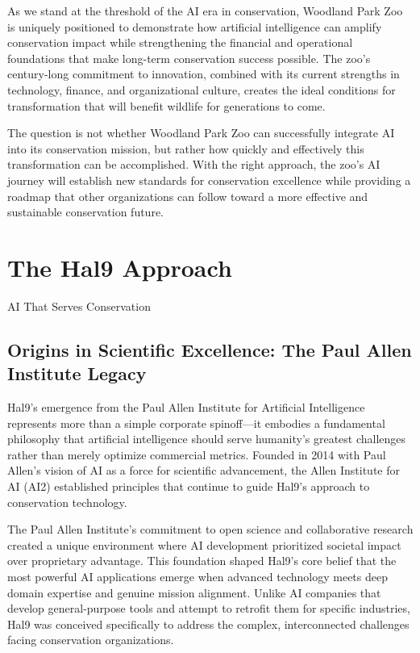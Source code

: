 \documentclass[
  Letterpaper,
]{scrbook}
\begin{document}
As we stand at the threshold of the AI era in conservation, Woodland
Park Zoo is uniquely positioned to demonstrate how artificial
intelligence can amplify conservation impact while strengthening the
financial and operational foundations that make long-term conservation
success possible. The zoo's century-long commitment to innovation,
combined with its current strengths in technology, finance, and
organizational culture, creates the ideal conditions for transformation
that will benefit wildlife for generations to come.

The question is not whether Woodland Park Zoo can successfully integrate
AI into its conservation mission, but rather how quickly and effectively
this transformation can be accomplished. With the right approach, the
zoo's AI journey will establish new standards for conservation
excellence while providing a roadmap that other organizations can follow
toward a more effective and sustainable conservation future.


\chapter{The Hal9 Approach}\label{the-hal9-approach}

AI That Serves Conservation

\hfill\break

\section{Origins in Scientific Excellence: The Paul Allen Institute
Legacy}\label{origins-in-scientific-excellence-the-paul-allen-institute-legacy}

Hal9's emergence from the Paul Allen Institute for Artificial
Intelligence represents more than a simple corporate spinoff---it
embodies a fundamental philosophy that artificial intelligence should
serve humanity's greatest challenges rather than merely optimize
commercial metrics. Founded in 2014 with Paul Allen's vision of AI as a
force for scientific advancement, the Allen Institute for AI (AI2)
established principles that continue to guide Hal9's approach to
conservation technology.

The Paul Allen Institute's commitment to open science and collaborative
research created a unique environment where AI development prioritized
societal impact over proprietary advantage. This foundation shaped
Hal9's core belief that the most powerful AI applications emerge when
advanced technology meets deep domain expertise and genuine mission
alignment. Unlike AI companies that develop general-purpose tools and
attempt to retrofit them for specific industries, Hal9 was conceived
specifically to address the complex, interconnected challenges facing
conservation organizations.
\end{document}
